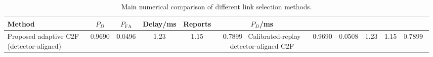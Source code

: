 \begin{table}[t]
    \centering
    \caption{Main numerical comparison of different link selection methods.}
    \label{tab:main_summary}
    \begin{tabular}{l c c c c c}
        \hline
        Method & $P_D$ & $P_{\mathrm{FA}}$ & Delay/ms & Reports & $P_D$/ms \\
        \hline
        Proposed adaptive C2F (detector-aligned) & 0.9690 & 0.0496 & 1.23 & 1.15 & 0.7899 \
        Calibrated-replay detector-aligned C2F & 0.9690 & 0.0508 & 1.23 & 1.15 & 0.7899 \
        \hline
    \end{tabular}
\end{table}
